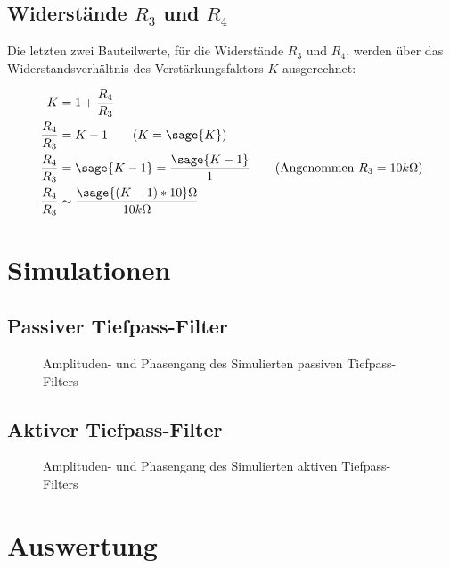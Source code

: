 \documentclass[a4paper]{hitec}
\begin{document}
\subsection{Widerstände $R_3$ und $R_4$}

Die letzten zwei Bauteilwerte, für die Widerstände $R_3$ und $R_4$, werden über das Widerstandsverhältnis des Verstärkungsfaktors $K$ ausgerechnet:

\begin{align*}
    K &= 1 + \frac{R_4}{R_3} \\
    \frac{R_4}{R_3} &= K - 1 \tag*{($K = \sage{K}$)} \\
    \frac{R_4}{R_3} &= \sage{K-1} = \frac{\sage{K-1}}{1} \tag*{(Angenommen $R_3 = 10k\Omega$)} \\
    \frac{R_4}{R_3} &\sim \frac{\sage{(K-1)*10}\Omega}{10k\Omega}
\end{align*}

\section{Simulationen}

\subsection{Passiver Tiefpass-Filter }

\begin{figure}[H]
    \centering
    
    \caption{Amplituden- und Phasengang des Simulierten passiven Tiefpass-Filters}
\end{figure}

\subsection{Aktiver Tiefpass-Filter }

\begin{figure}[H]
    \centering
    
    \caption{Amplituden- und Phasengang des Simulierten aktiven Tiefpass-Filters}
\end{figure}

\clearpage

\section{Auswertung}
\end{document}
